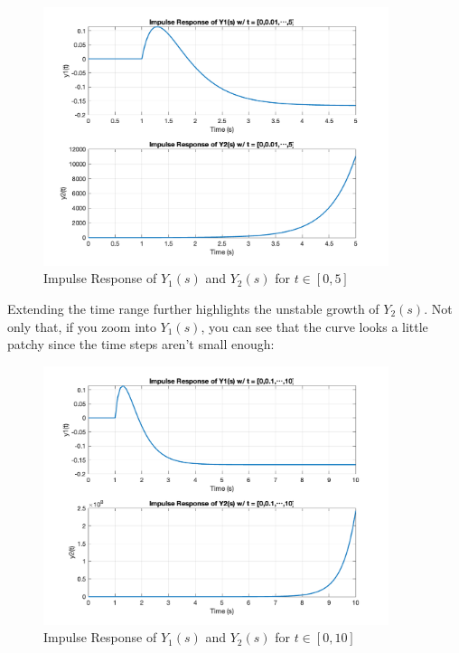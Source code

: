 \documentclass[12pt]{article}
\begin{document}
\begin{enumerate}
\begin{enumerate}
    \begin{figure}[H]
      \centering
      \includegraphics[width=0.9\textwidth]{Figures/figure1-3a.png}
      \caption{Impulse Response of \( Y_1(s) \) and \( Y_2(s) \) for \( t \in [0,5] \)}
      \label{fig:figure12} 
    \end{figure}

    Extending the time range further highlights the unstable growth of \( Y_2(s) \). Not only that, if you zoom into \( Y_1(s) \), you can see that the curve looks a little patchy since the time steps aren't small enough:

    \begin{figure}[H]
      \centering
      \includegraphics[width=0.9\textwidth]{Figures/figure1-3b.png}
      \caption{Impulse Response of \( Y_1(s) \) and \( Y_2(s) \) for \( t \in [0,10] \)}
      \label{fig:figure13} 
    \end{figure}


\end{enumerate}
\end{enumerate}
\end{document}
